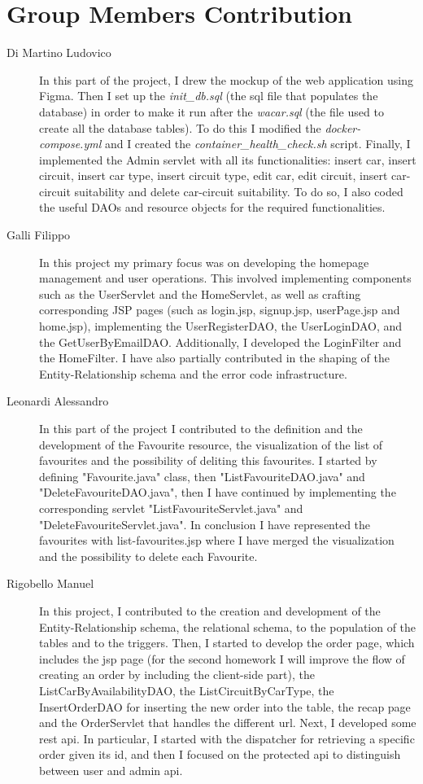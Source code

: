 \section{Group Members Contribution}


\begin{description}
	\item[Di Martino Ludovico] In this part of the project, I drew the mockup of the web application using Figma. Then I set up the \textit{init\_db.sql} (the sql file that populates the database) in order to make it run after the \textit{wacar.sql} (the file used to create all the database tables). To do this I modified the \textit{docker-compose.yml} and I created the \textit{container\_health\_check.sh} script. Finally, I implemented the Admin servlet with all its functionalities: insert car, insert circuit, insert car type, insert circuit type, edit car, edit circuit, insert car-circuit suitability and delete car-circuit suitability. To do so, I also coded the useful DAOs and resource objects for the required functionalities.
	\item[Galli Filippo] In this project my primary focus was on developing the homepage management and user operations. This involved implementing components such as the UserServlet and the HomeServlet, as well as crafting corresponding JSP pages (such as login.jsp, signup.jsp, userPage.jsp and home.jsp), implementing the UserRegisterDAO, the UserLoginDAO, and the GetUserByEmailDAO. Additionally, I developed the LoginFilter and the HomeFilter. I have also partially contributed in the shaping of the Entity-Relationship schema and the error code infrastructure.
	\item[Leonardi Alessandro] In this part of the project I contributed to the definition and the development of the Favourite resource, the visualization of the list of favourites and the possibility of deliting this favourites. I started by defining "Favourite.java" class, then "ListFavouriteDAO.java" and "DeleteFavouriteDAO.java", then I have continued by implementing the corresponding servlet "ListFavouriteServlet.java" and "DeleteFavouriteServlet.java". In conclusion I have represented the favourites with list-favourites.jsp where I have merged the visualization and the possibility to delete each Favourite. 
	\item[Rigobello Manuel] In this project, I contributed to the creation and development of the Entity-Relationship schema, the relational schema, to the population of the tables and to the triggers. Then, I started to develop the order page, which includes the jsp page (for the second homework I will improve the flow of creating an order by including the client-side part), the ListCarByAvailabilityDAO, the ListCircuitByCarType, the InsertOrderDAO for inserting the new order into the table, the recap page and the OrderServlet that handles the different url. Next, I developed some rest api. In particular, I started with the dispatcher for retrieving a specific order given its id, and then I focused on the protected api to distinguish between user and admin api.

\end{description}
